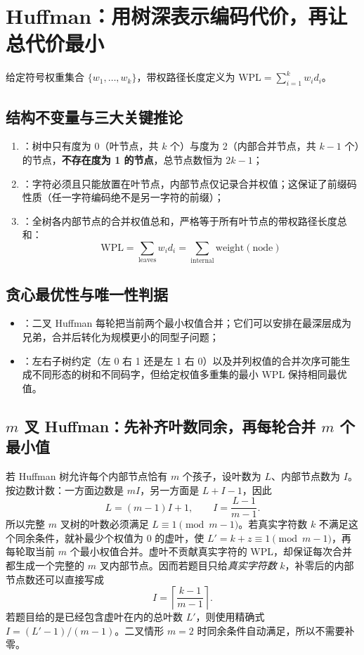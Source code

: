 \documentclass[UTF8,fontset=none,11pt,a4paper]{ctexart}
\begin{document}
\section{Huffman：用树深表示编码代价，再让总代价最小}
给定符号权重集合 $\{w_1, \ldots, w_k\}$，带权路径长度定义为 $\text{WPL} = \sum_{i=1}^k w_i d_i$。

\subsection{结构不变量与三大关键推论}
\begin{enumerate}
  \item {}：树中只有度为 0（叶节点，共 $k$ 个）与度为 2（内部合并节点，共 $k-1$ 个）的节点，\textbf{不存在度为 1 的节点}，总节点数恒为 $2k - 1$；
  \item {}：字符必须且只能放置在叶节点，内部节点仅记录合并权值；这保证了前缀码性质（任一字符编码绝不是另一字符的前缀）；
  \item {}：全树各内部节点的合并权值总和，严格等于所有叶节点的带权路径长度总和：
  \[
  \text{WPL} = \sum_{\text{leaves}} w_i d_i = \sum_{\text{internal}} \text{weight}(\text{node})
  \]
\end{enumerate}

\subsection{贪心最优性与唯一性判据}
\begin{itemize}
  \item {}：二叉 Huffman 每轮把当前两个最小权值合并；它们可以安排在最深层成为兄弟，合并后转化为规模更小的同型子问题；
  \item {}：左右子树约定（左 0 右 1 还是左 1 右 0）以及并列权值的合并次序可能生成不同形态的树和不同码字，但给定权值多重集的最小 WPL 保持相同最优值。
\end{itemize}

\subsection{$m$ 叉 Huffman：先补齐叶数同余，再每轮合并 $m$ 个最小值}
若 Huffman 树允许每个内部节点恰有 $m$ 个孩子，设叶数为 $L$、内部节点数为 $I$。按边数计数：一方面边数是 $mI$，另一方面是 $L+I-1$，因此
\[
\boxed{L=(m-1)I+1},\qquad
\boxed{I=\frac{L-1}{m-1}}.
\]
所以完整 $m$ 叉树的叶数必须满足 $L\equiv1\pmod{m-1}$。若真实字符数 $k$ 不满足这个同余条件，就补最少个权值为 $0$ 的虚叶，使 $L'=k+z\equiv1\pmod{m-1}$，再每轮取当前 $m$ 个最小权值合并。虚叶不贡献真实字符的 WPL，却保证每次合并都生成一个完整的 $m$ 叉内部节点。因而若题目只给\emph{真实字符数} $k$，补零后的内部节点数还可以直接写成
\[
\boxed{I=\left\lceil\frac{k-1}{m-1}\right\rceil}.
\]
若题目给的是已经包含虚叶在内的总叶数 $L'$，则使用精确式 $I=(L'-1)/(m-1)$。二叉情形 $m=2$ 时同余条件自动满足，所以不需要补零。
\end{document}
